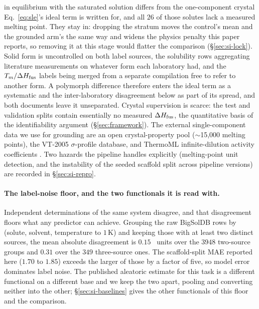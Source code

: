 in equilibrium with the saturated solution differs from the one-component crystal Eq.~\ref{eq:sle}'s ideal
term is written for, and all $26$ of those solutes lack a measured melting point. They stay in:
dropping the stratum moves the control's mean and the grounded arm's the same way and widens the
physics penalty this paper reports, so removing it at this stage would flatter the comparison
(\S\ref{sec:si-lock}). Solid form is uncontrolled on both label sources, the solubility rows
aggregating literature measurements on whatever form each laboratory had, and the $T_m/\Delta H_{\mathrm{fus}}$ labels
being merged from a separate compilation free to refer to another form. A polymorph
difference therefore enters the ideal term as a systematic and the inter-laboratory disagreement below as
part of its spread, and both documents leave it unseparated. Crystal supervision is
scarce: the test and validation splits contain essentially no measured $\Delta H_{\mathrm{fus}}$, the quantitative
basis of the identifiability argument (\S\ref{sec:framework}). The external single-component data
we use for grounding are an open crystal-property pool ($\sim$15{,}000 melting points), the VT-2005
$\sigma$-profile database, and ThermoML infinite-dilution activity coefficients
\cite{frenkel2011thermoml}. Two hazards the pipeline handles explicitly (melting-point unit
detection, and the instability of the seeded scaffold split across pipeline versions) are recorded
in \S\ref{sec:si-repro}.

\paragraph{The label-noise floor, and the two functionals it is read with.}
Independent determinations of the same system disagree, and that disagreement floors what any
predictor can achieve. Grouping the raw BigSolDB rows by (solute, solvent, temperature to $1$\,K)
and keeping those with at least two distinct sources, the mean absolute disagreement is $0.15$ \lnx\
units over the $3948$ two-source groups and $0.31$ over the $349$ three-source ones. The
scaffold-split MAE reported here ($1.70$ to $1.85$) exceeds the larger of those by a factor of five,
so model error dominates label noise. The published aleatoric estimate for this task is a different
functional on a different base \cite{osanloo2024} and we keep the two apart, pooling and converting
neither into the other; \S\ref{sec:si-baselines} gives the other functionals of this floor and the
comparison.

